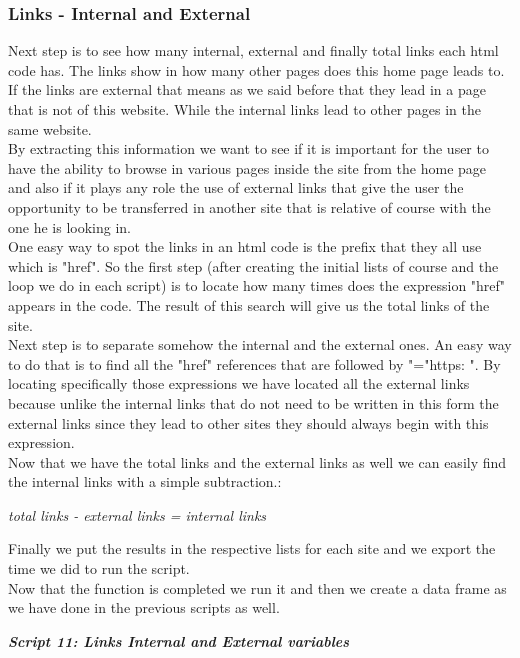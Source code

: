 \documentclass{article}
\begin{document}
\subsubsection{Links - Internal and External}
Next step is to see how many internal, external and finally total links each html code has. The links show in how many other pages does this home page leads to. If the links are external that means as we said before that they lead in a page that is not of this website. While the internal links lead to other pages in the same website.\\
By extracting this information we want to see if it is important for the user to have the ability to browse in various pages inside the site from the home page and also if it plays any role the use of external links that give the user the opportunity to be transferred in another site that is relative of course with the one he is looking in.\\
One easy way to spot the links in an html code is the prefix that they all use which is "href". So the first step (after creating the initial lists of course and the loop we do in each script) is to locate how many times does the expression "href" appears in the code. The result of this search will give us the total links of the site.\\
Next step is to separate somehow the internal and the external ones. An easy way to do that is to find all the "href" references that are followed by "="https: ". By locating specifically those expressions we have located all the external links because unlike the internal links that do not need to be written in this form the external links since they lead to other sites they should always begin with this expression.\\
Now that we have the total links and the external links as well we can easily find the internal links with a simple subtraction.:\
\begin{center}
\textit{total links - external links = internal links}
\end{center}
Finally we put the results in the respective lists for each site and we export the time we did to run the script.\\
Now that the function is completed we run it and then we create a data frame as we have done in the previous scripts as well.
\begin{center}
\textit{\textbf{Script 11: Links Internal and External variables}}
\end{center}
\end{document}
